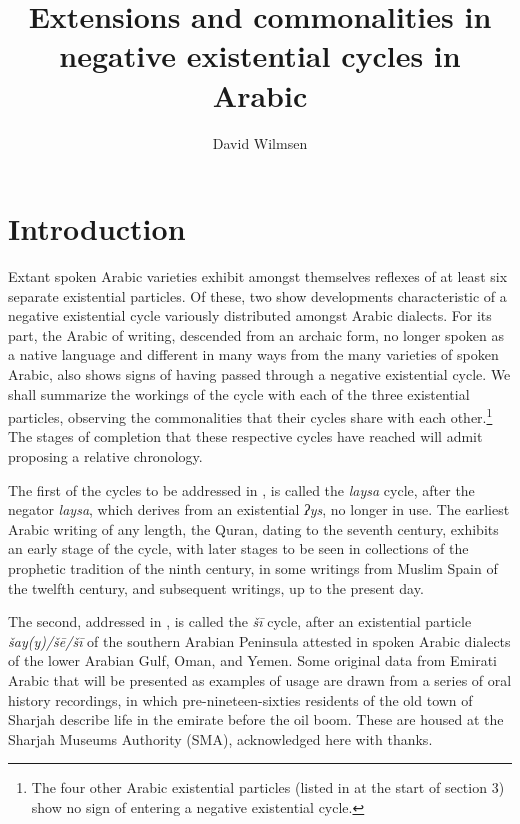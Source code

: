 \documentclass[output=paper,colorlinks,citecolor=brown]{langscibook}
\author{David Wilmsen\affiliation{American University of Sharjah}}
\title{Extensions and commonalities in negative existential cycles in Arabic}
\begin{document}
\maketitle

\section{Introduction} \label{s:WiAR-1}

Extant spoken Arabic varieties exhibit amongst themselves reflexes of at least six separate existential particles. Of these, two show developments characteristic of a negative existential cycle \citep{Croft1991} variously distributed amongst Arabic dialects. For its part, the Arabic of writing, descended from an archaic form, no longer spoken as a native language and different in many ways from the many varieties of spoken Arabic, also shows signs of having passed through a negative existential cycle. We shall summarize the workings of the cycle with each of the three existential particles, observing the commonalities that their cycles share with each other.\footnote{The four other Arabic existential particles (listed in  at the start of section 3) show no sign of entering a negative existential cycle.} The stages of completion that these respective cycles have reached will admit proposing a relative chronology.

The first of the cycles to be addressed in , is called the \textit{laysa} cycle, after the negator \textit{laysa}, which derives from an existential \textit{ʔys}, no longer in use. The earliest Arabic writing of any length, the Quran, dating to the seventh century, exhibits an early stage of the cycle, with later stages to be seen in collections of the prophetic tradition of the ninth century, in some writings from Muslim Spain of the twelfth century, and subsequent writings, up to the present day.

The second, addressed in , is called the \textit{šī} cycle, after an existential particle \textit{šay(y)/šē/šī} of the southern Arabian Peninsula attested in spoken Arabic dialects of the lower Arabian Gulf, Oman, and Yemen. Some original data from Emirati Arabic that will be presented as examples of usage are drawn from a series of oral history recordings, in which pre-nineteen-sixties residents of the old town of Sharjah describe life in the emirate before the oil boom. These are housed at the Sharjah Museums Authority (SMA), acknowledged here with thanks.
\end{document}

